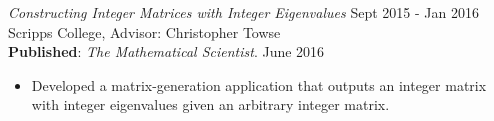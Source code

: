 {\sl Constructing Integer Matrices with Integer Eigenvalues} \hfill Sept 2015 - Jan 2016\\
Scripps College, Advisor: Christopher Towse \\
\textbf{Published}: \textit{The Mathematical Scientist}. June 2016 %
\begin{itemize} \itemsep -2pt
  \item Developed a matrix-generation application that outputs an integer matrix
    with integer eigenvalues given an arbitrary integer matrix.
\end{itemize}
        
